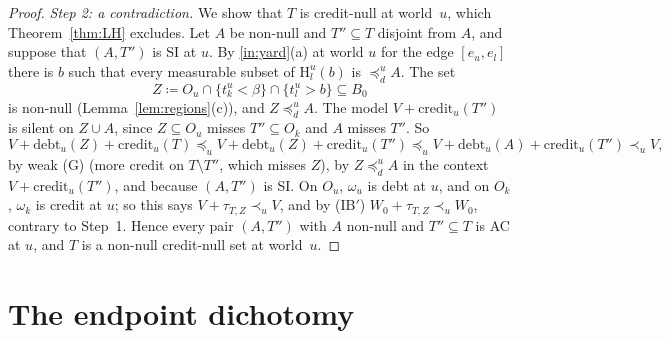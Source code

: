 \documentclass[11pt]{article}
\theoremstyle{definition}\newtheorem{definition}[theorem]{Definition}
\theoremstyle{remark}\newtheorem{remark}[theorem]{Remark}
\newcommand{\debt}{\mathrm{debt}}
\newcommand{\cred}{\mathrm{credit}}
\newcommand{\Hi}[3]{\mathrm H^{#1}_{#2}(#3)}
\begin{document}
\begin{proof}
\emph{Step 2: a contradiction.} We show that $T$ is credit-null at
world~$u$, which Theorem~\ref{thm:LH} excludes. Let $A$ be non-null and
$T''\subseteq T$ disjoint from $A$, and suppose that $(A,T'')$ is SI at $u$.
By \ref{in:yard}(a) at world $u$ for the edge $[e_u,e_l]$ there is $b$ such
that every measurable subset of $\Hi ulb$ is $\preceq^u_dA$. The set
\[
 Z\coloneqq O_u\cap\{t^u_k<\beta\}\cap\{t^u_l>b\}\subseteq B_0
\]
is non-null (Lemma~\ref{lem:regions}(c)), and $Z\preceq^u_dA$. The model
$V+\cred_u(T'')$ is silent on $Z\cup A$, since $Z\subseteq O_u$ misses
$T''\subseteq O_k$ and $A$ misses $T''$. So
\[
 V+\debt_u(Z)+\cred_u(T)\preceq_uV+\debt_u(Z)+\cred_u(T'')\preceq_u
 V+\debt_u(A)+\cred_u(T'')\prec_uV,
\]
by weak (G) (more credit on $T\setminus T''$, which misses $Z$), by
$Z\preceq^u_dA$ in the context $V+\cred_u(T'')$, and because $(A,T'')$ is SI.
On $O_u$, $\omega_u$ is debt at $u$, and on $O_k$, $\omega_k$ is credit at
$u$; so this says $V+\tau_{T,Z}\prec_uV$, and by (IB$'$)
$W_0+\tau_{T,Z}\prec_uW_0$, contrary to Step~1. Hence every pair $(A,T'')$
with $A$ non-null and $T''\subseteq T$ is AC at $u$, and $T$ is a non-null
credit-null set at world~$u$.
\end{proof}

\section{The endpoint dichotomy}\label{sec:dichotomy}
\end{document}
